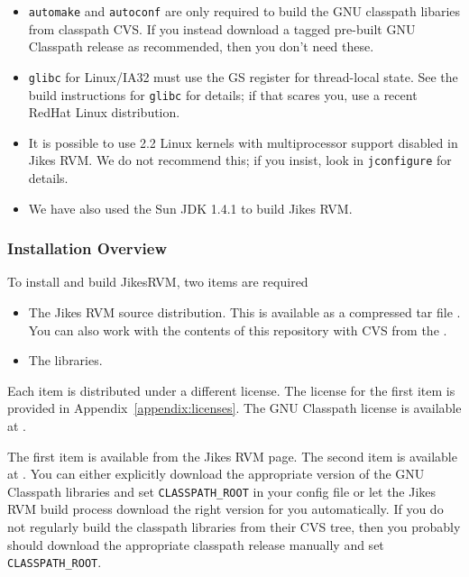\begin{itemize}
\item {\tt automake} and {\tt autoconf} are only required to build the
GNU classpath libaries from classpath CVS. If you instead download a
tagged pre-built GNU Classpath release as recommended, then you don't need
these.
\item {\tt glibc} for Linux/IA32 must use the GS register for
thread-local state.  See the build instructions for {\tt glibc} for details;
if that scares you, use a recent RedHat Linux distribution.

\item It is possible to use 2.2 Linux kernels with multiprocessor
support disabled in Jikes RVM.  We do not recommend this; if you
insist, look in {\tt jconfigure} for details.
\item We have also used the Sun JDK 1.4.1 to build Jikes RVM.
\end{itemize}

\AIXPPCJikesTMFooter

\JavaTMFooter

\subsubsection{Installation Overview}

To install and build Jikes\trademark RVM, two items are required
\begin{itemize}
\item The Jikes RVM source distribution.  This is available as a
compressed tar file {\tt \RVMTarFile}.  You can also work with the
contents of this repository with CVS from the 
.

\item The 
 libraries. 
\end{itemize}

Each item is distributed under a different license.  The license for
the first item is provided in Appendix~\ref{appendix:licenses}.  The
GNU Classpath license is available at \xlink{{\tt
\classpathURL}}{\classpathURL}. 

The first item is available  from the Jikes RVM
 page. The second item is available at
\xlink{{\tt \classpathURL}}{\classpathURL}.
You can either explicitly download the appropriate version of the GNU
Classpath libraries and set {\tt CLASSPATH\_ROOT} in your config file or let
the Jikes RVM build process download the right version for you
automatically. If you do not regularly build the classpath libraries
from their CVS tree, then you probably should download the appropriate
classpath release manually and set {\tt CLASSPATH\_ROOT}. 

